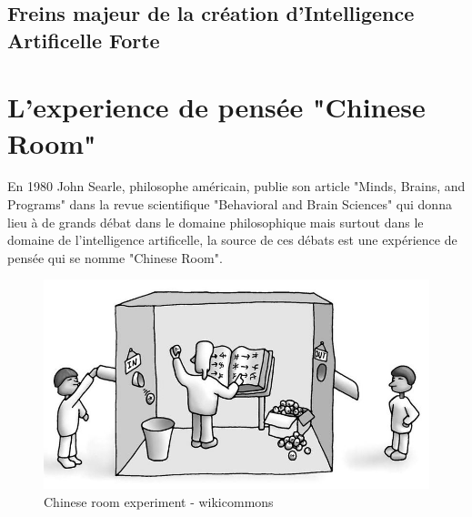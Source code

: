 \subsection{Freins majeur de la création d'Intelligence Artificelle Forte}

%
%
%
\newpage
\section{L'experience de pensée "Chinese Room"}
En 1980 John Searle, philosophe américain, publie son article "Minds, Brains, and Programs" dans la revue 
scientifique "Behavioral and Brain Sciences" qui donna lieu à de grands débat dans le domaine philosophique 
mais surtout dans le domaine de l'intelligence artificelle, 
la source de ces débats est une expérience de pensée qui se nomme "Chinese Room". \newline

\begin{figure}[!h]
    \centering
    \includegraphics[width=1\textwidth]{Images/chineseroom}
    \caption{Chinese room experiment - wikicommons}
	\label{fig:chineseroom}
\end{figure}

